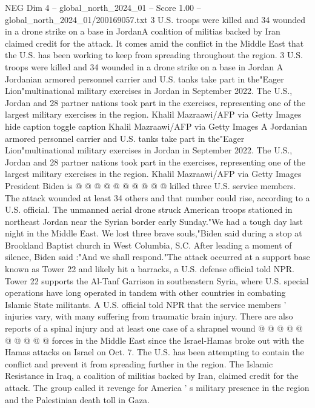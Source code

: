 \begin{textsample}{NEG Dim 4 – global\_north\_2024\_01 – Score 1.00 – global\_north\_2024\_01/200169057.txt}  \label{ex:f4_neg_117}
3 U.S. troops were killed and 34 wounded in a drone strike on a base in JordanA coalition of militias backed by Iran claimed credit for the attack.
It comes amid the conflict in the Middle East that the U.S. has been working to keep from spreading throughout the region. 3 U.S. troops were killed and 34 wounded in a drone strike on a base in Jordan A Jordanian armored personnel carrier and U.S. tanks take part in the"Eager Lion"multinational military exercises in Jordan in September 2022.
The U.S., Jordan and 28 partner nations took part in the exercises, representing one of the largest military exercises in the region.
Khalil Mazraawi/AFP via Getty Images hide caption toggle caption Khalil Mazraawi/AFP via Getty Images A Jordanian armored personnel carrier and U.S. tanks take part in the"Eager Lion"multinational military exercises in Jordan in September 2022.
The U.S., Jordan and 28 partner nations took part in the exercises, representing one of the largest military exercises in the region.
Khalil Mazraawi/AFP via Getty Images President Biden is @ @ @ @ @ @ @ @ @ @ killed three U.S. service members.
The attack wounded at least 34 others and that number could rise, according to a U.S. official.
The unmanned aerial drone struck American troops stationed in northeast Jordan near the Syrian border early Sunday."We had a tough day last night in the Middle East.
We lost three brave souls,"Biden said during a stop at Brookland Baptist church in West Columbia, S.C.
After leading a moment of silence, Biden said :"And we shall respond."The attack occurred at a support base known as Tower 22 and likely hit a barracks, a U.S. defense official told NPR.
Tower 22 supports the Al-Tanf Garrison in southeastern Syria, where U.S. special operations have long operated in tandem with other countries in combating Islamic State militants.
A U.S. official told NPR that the service members ' injuries vary, with many suffering from traumatic brain injury.
There are also reports of a spinal injury and at least one case of a shrapnel wound @ @ @ @ @ @ @ @ @ @ forces in the Middle East since the Israel-Hamas broke out with the Hamas attacks on Israel on Oct. 7.
The U.S. has been attempting to contain the conflict and prevent it from spreading further in the region.
The Islamic Resistance in Iraq, a coalition of militias backed by Iran, claimed credit for the attack.
The group called it revenge for America ' s military presence in the region and the Palestinian death toll in Gaza.

\end{textsample}
